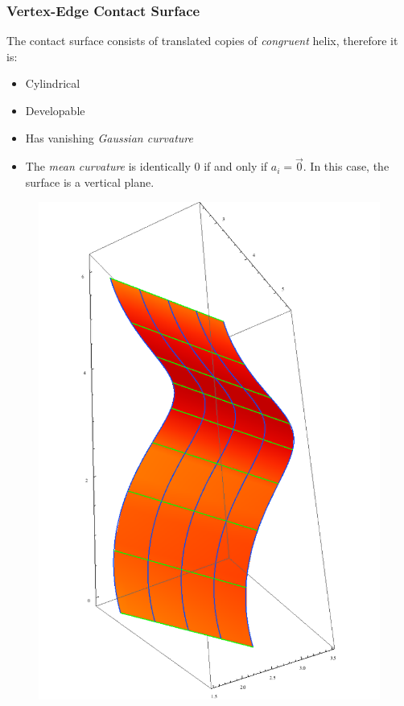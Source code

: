 \documentclass[ucs,9pt,pagenumbers]{beamer}
\begin{document}
\begin{frame}
  \frametitle{Vertex-Edge Contact Surface}
  \begin{minipage}{0.63\linewidth}
    The contact surface consists of translated copies of \emph{congruent}
    helix, therefore it is:
    \begin{itemize}
    \item Cylindrical
    \item Developable
    \item Has vanishing \emph{Gaussian curvature}
    \item The \emph{mean curvature} is identically \(0\) if and only if \(a_i = \vec{0}\). In this case, the surface is a vertical plane.
    \end{itemize}
  \end{minipage}
  \hfill
  \begin{minipage}{0.35\linewidth}
    \begin{figure}
      \centering
      \includegraphics[height=0.9\textheight]{Figures/ve-full-contact}
    \end{figure}
  \end{minipage}
\end{frame}
\end{document}
